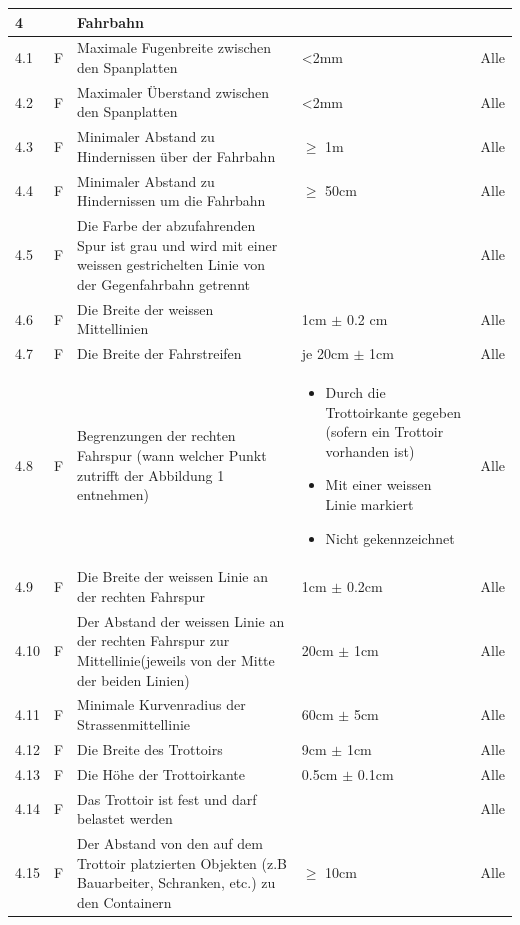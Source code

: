 \begin{center}
\begin{tabular}{|p{1cm}|p{0.5cm}|p{5cm}|p{5cm}|p{1.5cm}|}\hline
 \textbf{4} & & \textbf{Fahrbahn} & & \\\hline
 4.1 & F & Maximale Fugenbreite zwischen den Spanplatten & <2mm & Alle\\\hline
 4.2 & F & Maximaler Überstand zwischen den Spanplatten & <2mm & Alle\\ \hline
 4.3 & F & Minimaler Abstand zu Hindernissen über der Fahrbahn &  $\geq$ 1m & Alle\\\hline
 4.4 & F & Minimaler Abstand zu Hindernissen um die Fahrbahn &  $\geq$ 50cm & Alle\\\hline
 4.5 & F & Die Farbe der abzufahrenden Spur ist grau und wird mit einer weissen gestrichelten Linie von der Gegenfahrbahn getrennt &   & Alle\\ \hline
 4.6 & F & Die Breite der weissen Mittellinien & 1cm $\pm$ 0.2 cm & Alle\\ \hline
 4.7 & F & Die Breite der Fahrstreifen & je 20cm $\pm$ 1cm & Alle\\ \hline
 4.8 & F & Begrenzungen der rechten Fahrspur (wann welcher Punkt zutrifft der Abbildung 1 entnehmen) & \begin{itemize} \item Durch die Trottoirkante gegeben (sofern ein Trottoir vorhanden ist)\item Mit einer weissen Linie markiert \item Nicht gekennzeichnet \end{itemize}  & Alle\\ \hline
 4.9 & F & Die Breite der weissen Linie an der rechten Fahrspur &  1cm $\pm$ 0.2cm & Alle\\ \hline
 4.10 & F & Der Abstand der weissen Linie an der rechten Fahrspur zur Mittellinie(jeweils von der Mitte der beiden Linien)&  20cm $\pm$ 1cm & Alle\\ \hline
 4.11 & F & Minimale Kurvenradius der Strassenmittellinie &  60cm $\pm$ 5cm & Alle\\ \hline
 4.12 & F & Die Breite des Trottoirs &  9cm $\pm$ 1cm & Alle\\ \hline
 4.13 & F & Die Höhe der Trottoirkante &  0.5cm $\pm$ 0.1cm & Alle\\ \hline
 4.14 & F & Das Trottoir ist fest und darf belastet werden & & Alle\\ \hline
 4.15 & F & Der Abstand von den auf dem Trottoir platzierten Objekten (z.B Bauarbeiter, Schranken, etc.) zu den Containern & $\geq$ 10cm & Alle\\ \hline

\end{tabular}
\end{center}
